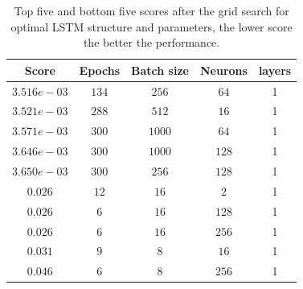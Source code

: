                 
                
                \begin{table}[]
                    \centering
                    \begin{tabular}{|c|c|c|c|c|}
                        \hline
                        Score       & Epochs    & Batch size    & Neurons   & layers   \\ \hline
                        $3.516e-03$     & $134$     & $256$          & $64$     & 1        \\ \hline
                        $3.521e-03$     & $288$     & $512$          & $16$      & 1        \\ \hline
                        $3.571e-03$     & $300$     & $1000$          & $64$      & 1    \\ \hline
                        $3.646e-03$     & $300$     & $1000$         & $128$      & 1   \\ \hline
                        $3.650e-03$     & $300$     & $256$         & $128$     & 1  \\ \hline
                        $0.026$         & $12$     & $16$          & $2$      & 1     \\ \hline
                        $0.026$         & $6$     & $16$        & $128$       & 1    \\ \hline
                        $0.026$         & $6$     & $16$        & $256$       & 1       \\ \hline
                        $0.031$         & $9$     & $8$          & $16$     & 1          \\ \hline
                        $0.046$         & $6$     & $8$          & $256$     & 1      \\ \hline
                    \end{tabular}
                    \caption{Top five and bottom five scores after the grid search for optimal LSTM structure and parameters, the lower score the better the performance.}
                    \label{tab:lstm_gri}
                \end{table}
                
